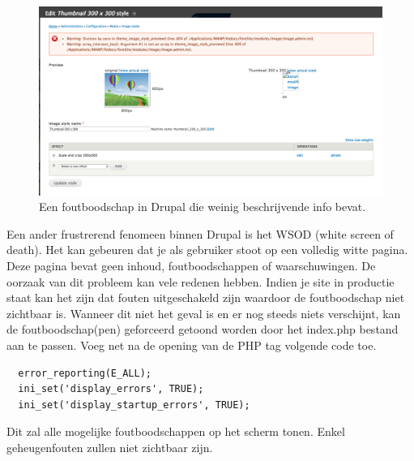 \pagebreak

\begin{figure}[!ht]
  \includegraphics[width=\textwidth]{img/dr-errors.png}
  \caption{Een foutboodschap in Drupal die weinig beschrijvende info bevat.}
  \label{fig:Drupal foutboodschap.}
\end{figure}

\noindent
Een ander frustrerend fenomeen binnen Drupal is het WSOD (white screen of death). Het kan gebeuren dat je als gebruiker stoot op een volledig witte pagina. Deze pagina bevat geen inhoud, foutboodschappen of waarschuwingen. De oorzaak van dit probleem kan vele redenen hebben. Indien je site in productie staat kan het zijn dat fouten uitgeschakeld zijn waardoor de foutboodschap niet zichtbaar is. Wanneer dit niet het geval is en er nog steeds niets verschijnt, kan de foutboodschap(pen) geforceerd getoond worden door het index.php bestand aan te passen. Voeg net na de opening van de PHP tag volgende code toe.

\begin{verbatim}
  error_reporting(E_ALL);
  ini_set('display_errors', TRUE);
  ini_set('display_startup_errors', TRUE);
\end{verbatim}

\noindent
Dit zal alle mogelijke foutboodschappen op het scherm tonen. Enkel geheugenfouten zullen niet zichtbaar zijn. 


